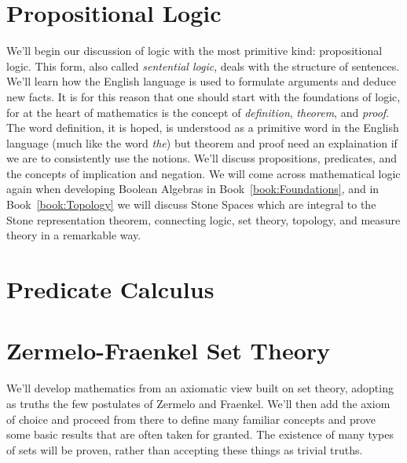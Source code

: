 \begingroup
    \ifcsname\PATH\endcsname
        \newcommand{\PATH}{books/Foundations/Logic_and_Sets}
        \newcommand{\OLDPATH}{\PATH}
    \else
        \newcommand{\OLDPATH}{\PATH}
        \renewcommand{\PATH}{books/Foundations/Logic_and_Sets}
    \fi
    \chapter{Propositional Logic}
        \label{chapt:Propositional_Logic}%
        We'll begin our discussion of logic with the most primitive kind:
        propositional logic. This form, also called
        \textit{sentential logic}, deals with the
        structure of sentences. We'll learn how the English language is used to
        formulate arguments and deduce new facts. It is for this reason that one
        should start with the foundations of logic, for at the heart of
        mathematics is the concept of \textit{definition}, \textit{theorem}, and
        \textit{proof}. The word definition, it is hoped, is understood as a
        primitive word in the English language (much like the word \textit{the})
        but theorem and proof need an explaination if we are to consistently use
        the notions. We'll discuss propositions, predicates, and the concepts of
        implication and negation. We will come across mathematical logic again
        when developing Boolean Algebras in
        Book~\ref{book:Foundations}, and in Book~\ref{book:Topology} we will
        discuss Stone Spaces which are integral to the Stone
        representation theorem, connecting
        logic, set theory, topology, and measure theory in a remarkable way.
        
        
    \chapter{Predicate Calculus}
        \label{chapt:Predicate_Calculus}%
        
    \chapter{Zermelo-Fraenkel Set Theory}
        \label{chapt:Zermelo_Fraenkel_Set_Theory}%
        We'll develop mathematics from an axiomatic view built on set theory,
        adopting as truths the few postulates of Zermelo and Fraenkel. We'll
        then add the axiom of choice and proceed from there to define many
        familiar concepts and prove some basic results that are often taken for
        granted. The existence of many types of sets will be proven, rather than
        accepting these things as trivial truths.
        
        
        
